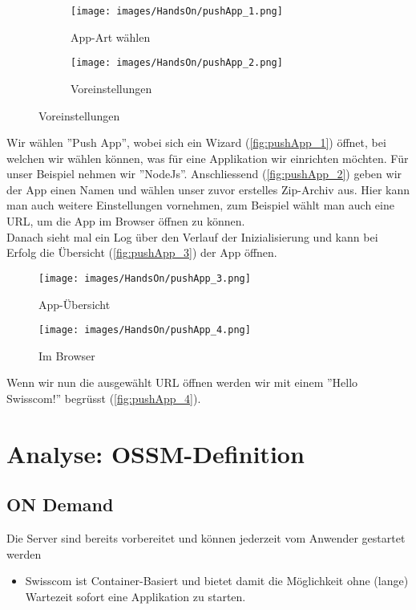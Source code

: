 \documentclass[11pt,titlepage]{article}
\begin{document}
\begin{figure}[H]
  \caption{Wizard}
  \begin{subfigure}{0.48\textwidth}
  \texttt{[image: images/HandsOn/pushApp\_1.png]} 
  \caption{App-Art wählen}
  \label{fig:pushApp_1}
  \end{subfigure}
  \begin{subfigure}{0.48\textwidth}
  \texttt{[image: images/HandsOn/pushApp\_2.png]}
  \caption{Voreinstellungen}
  \label{fig:pushApp_2}
  \end{subfigure}
\end{figure}
Wir wählen ''Push App'', wobei sich ein Wizard (\autoref{fig:pushApp_1}) öffnet, bei welchen wir wählen können, 
was für eine Applikation wir einrichten möchten. Für unser Beispiel nehmen wir ''NodeJs''.
Anschliessend (\autoref{fig:pushApp_2}) geben wir der App einen Namen und wählen unser zuvor erstelles Zip-Archiv aus.
Hier kann man auch weitere Einstellungen vornehmen, zum Beispiel wählt man auch eine URL, um die App im Browser öffnen zu können.\\
Danach sieht mal ein Log über den Verlauf der Inizialisierung und kann bei Erfolg die Übersicht (\autoref{fig:pushApp_3}) der App öffnen. 
\begin{figure}[H]
  \begin{center}
    \texttt{[image: images/HandsOn/pushApp\_3.png]}
    \caption{App-Übersicht}
    \label{fig:pushApp_3}
  \end{center}
\end{figure}

\begin{wrapfigure}[2]{HL}{0.4\textwidth}
  \texttt{[image: images/HandsOn/pushApp\_4.png]}
  \caption{Im Browser}
  \label{fig:pushApp_4}
\end{wrapfigure}
Wenn wir nun die ausgewählt URL öffnen werden wir mit einem ''Hello Swisscom!'' begrüsst (\autoref{fig:pushApp_4}).
\pagebreak

\section{Analyse: OSSM-Definition}
\label{sec:analyse}

\subsection{ON Demand}
Die Server sind bereits vorbereitet und können jederzeit vom Anwender gestartet werden
\begin{itemize}
	\item Swisscom ist Container-Basiert und bietet damit die Möglichkeit ohne (lange)
	Wartezeit sofort eine Applikation zu starten.
\end{itemize}
\end{document}
